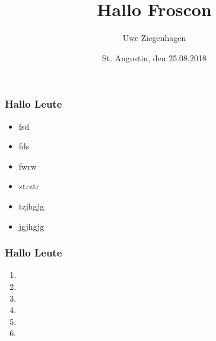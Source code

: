 \documentclass[12pt,ngerman]{beamer}
\title{Hallo Froscon}
\author{Uwe Ziegenhagen}
\date{St. Augustin, den 25.08.2018}
\begin{document}
\begin{frame}

\maketitle

\end{frame}

\begin{frame}
\frametitle{Hallo Leute}

\begin{itemize}[<+->]
\item fsd
\item fds
\item fwrw
\item ztrztr
\item tzjhgjg
\item jgjhgjg
\end{itemize}
\end{frame}


\begin{frame}
\frametitle{Hallo Leute}


\begin{enumerate}
\item 
\item 
\item 
\item 
\item 
\item 
\end{enumerate}
\end{frame}
\end{document}

